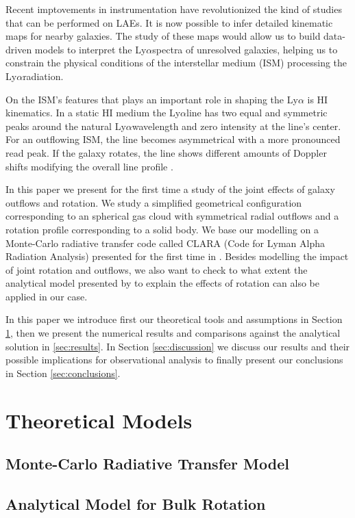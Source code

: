 \documentclass[a4,useAMS,usenatbib,usegraphicx]{mn2e}
\newcommand{\lya}{Ly$\alpha$}
\begin{document}
Recent imptovements in instrumentation have revolutionized the kind of
studies that can be performed on LAEs.  
It is now possible to infer detailed kinematic maps for nearby galaxies.
The study of these maps would allow us to build data-driven models to
interpret the \lya spectra of unresolved galaxies, helping us to
constrain the physical conditions of the interstellar medium (ISM)
processing the \lya radiation.

On the ISM's features that plays an important role in shaping the \lya
is HI kinematics. 
In a static HI medium the \lya line has  two equal and symmetric peaks
around the natural \lya wavelength and zero intensity at the line's
center.
For an outflowing ISM, the line becomes
asymmetrical with a more pronounced read peak.
If the galaxy rotates, the line shows different amounts of Doppler
shifts modifying the overall line profile \cite{Garavito14}.

In this paper we present for the first time a study of the joint
effects of galaxy outflows and rotation.
We study a simplified geometrical configuration corresponding to an
spherical gas cloud with symmetrical radial outflows and a rotation
profile corresponding to a solid body.
We base our modelling on a Monte-Carlo radiative transfer code called
CLARA (Code for Lyman Alpha Radiation Analysis) presented for the
first time in \cite{CLARA}.
Besides modelling the impact of joint rotation and outflows, we also
want to check to what extent the analytical model presented by
\cite{Garavito14} to explain the effects of rotation can also be
applied in our case.

In this paper we introduce first our theoretical tools and assumptions
in Section \ref{sec:theory}, then we present the numerical results and
comparisons against the analytical solution in \ref{sec:results}.
In Section \ref{sec:discussion} we discuss our results and their
possible implications for observational analysis to finally present
our conclusions in Section \ref{sec:conclusions}.


\section{Theoretical Models}
\label{sec:theory}

\subsection{Monte-Carlo Radiative Transfer Model}

\subsection{Analytical Model for Bulk Rotation}
\end{document}
